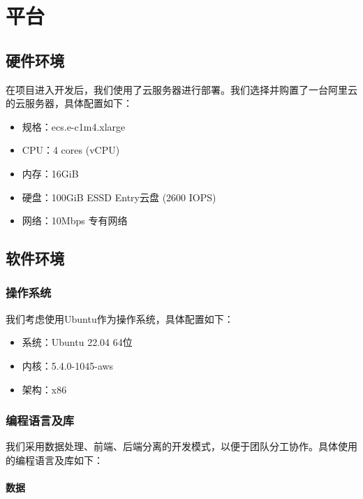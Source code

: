\documentclass[UTF8,openany]{ctexbook}
\begin{document}
\chapter{平台}
\label{sec:platform}

\section{硬件环境}

在项目进入开发后，我们使用了云服务器进行部署。我们选择并购置了一台阿里云的云服务器，具体配置如下：

\begin{itemize}
    \item 规格：ecs.e-c1m4.xlarge
    \item CPU：4 cores (vCPU)
    \item 内存：16GiB
    \item 硬盘：100GiB ESSD Entry云盘 (2600 IOPS)
    \item 网络：10Mbps 专有网络
    
\end{itemize}

\section{软件环境}

\subsection{操作系统}

我们考虑使用Ubuntu作为操作系统，具体配置如下：

\begin{itemize}
    \item 系统：Ubuntu 22.04 64位
    \item 内核：5.4.0-1045-aws
    \item 架构：x86
\end{itemize}

\subsection{编程语言及库}

我们采用数据处理、前端、后端分离的开发模式，以便于团队分工协作。具体使用的编程语言及库如下：

\subsubsection{数据}
\end{document}
